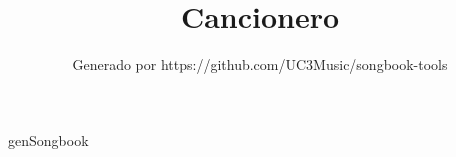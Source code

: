 \documentclass[11pt,a4paper,openany]{book}  %
\begin{document}
\Large

\title{Cancionero}
\author{Generado por https://github.com/UC3Music/songbook-tools} 

\maketitle
\cleardoublepage
\tableofcontents
\newpage  %


genSongbook

\end{document}
